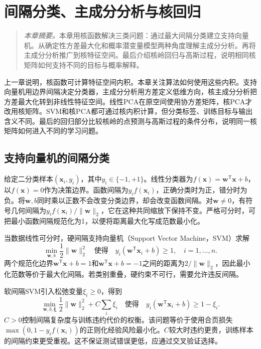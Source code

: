 \chapter{间隔分类、主成分分析与核回归}
\label{chap:kernel-algorithms}
\begin{quote}\small
\textit{本章摘要。}本章用核函数解决三类问题：通过最大间隔分类建立支持向量机。从确定性方差最大化和概率潜变量模型两种角度理解主成分分析。再将主成分分析推广到核特征空间。最后介绍核岭回归与高斯过程，说明相同核矩阵如何支持不同的目标与概率解释。
\end{quote}

上一章说明，核函数可计算特征空间内积。本章关注算法如何使用这些内积。支持向量机用边界间隔决定分类器，主成分分析用方差定义低维方向，核主成分分析把方差最大化转到非线性特征空间。线性PCA在原空间使用协方差矩阵，核PCA才改用核矩阵。SVM和核PCA都可通过核内积计算，但分类标签、训练目标与输出含义不同。最后的回归部分比较核岭的点预测与高斯过程的条件分布，说明同一核矩阵如何进入不同的学习问题。

\section{支持向量机的间隔分类}
给定二分类样本$(\bm x_i,y_i)$，其中$y_i\in\{-1,+1\}$。线性分类器为$f(\bm x)=\bm w^{\mathsf T}\bm x+b$，以$f(\bm x)=0$作为决策边界。函数间隔为$y_i f(\bm x_i)$，正确分类时为正，错分时为负。将$\bm w,b$同时乘以正数不会改变分类边界，却会改变函数间隔。对$\bm w\ne0$，有符号几何间隔为$y_i f(\bm x_i)/\|\bm w\|_2$，它在这种共同缩放下保持不变。严格可分时，可把最小函数间隔规范化为1，以便将距离最大化写成范数最小化。

当数据线性可分时，硬间隔支持向量机（Support Vector Machine，SVM）求解
\begin{equation}
 \min_{\bm w,b}\frac12\|\bm w\|_2^2
 \quad\text{使得}\quad y_i(\bm w^{\mathsf T}\bm x_i+b)\geq1,\quad i=1,\ldots,n.
 \label{eq:svm-hard-margin-primal}
\end{equation}
两个规范化边界$\bm w^{\mathsf T}\bm x+b=1$和$\bm w^{\mathsf T}\bm x+b=-1$之间的距离为$2/\|\bm w\|_2$，因此最小化范数等价于最大化间隔。若类别重叠，硬约束不可行，需要允许违反间隔。

软间隔SVM引入松弛变量$\xi_i\geq0$，得到
\begin{equation}
 \min_{\bm w,b,\bm\xi}\frac12\|\bm w\|_2^2+C\sum_i\xi_i
 \quad\text{使得}\quad y_i(\bm w^{\mathsf T}\bm x_i+b)\geq1-\xi_i.
 \label{eq:svm-soft-margin-primal}
\end{equation}
$C>0$控制间隔复杂度与训练违约代价的权衡。该问题等价于使用合页损失$\max(0,1-y_if(\bm x_i))$的正则化经验风险最小化。$C$较大时违约更贵，训练样本的间隔约束更受重视。这不保证测试错误更低，应通过交叉验证选择。

